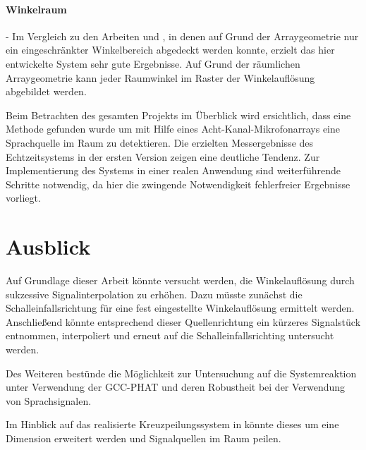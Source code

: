 \paragraph{Winkelraum} - Im Vergleich zu den Arbeiten \cite{Master_Array_Pikora}
 und \cite{Master_Array_Mueller}, in denen auf Grund der Arraygeometrie nur ein eingeschränkter Winkelbereich abgedeckt werden konnte, erzielt das hier entwickelte System sehr gute Ergebnisse. Auf Grund der räumlichen Arraygeometrie kann jeder Raumwinkel im Raster der Winkelauflösung abgebildet werden.
 
 

Beim Betrachten des gesamten Projekts im Überblick wird ersichtlich, dass eine Methode gefunden wurde um mit Hilfe eines Acht-Kanal-Mikrofonarrays eine Sprachquelle im Raum zu detektieren. Die erzielten Messergebnisse des Echtzeitsystems in der ersten Version zeigen eine deutliche Tendenz. Zur Implementierung des Systems in einer realen Anwendung sind weiterführende Schritte notwendig, da hier die zwingende Notwendigkeit fehlerfreier Ergebnisse vorliegt.



\section{Ausblick}
\label{sec:Ausblick}
Auf Grundlage dieser Arbeit könnte versucht werden, die Winkelauflösung durch sukzessive Signalinterpolation zu erhöhen. Dazu müsste zunächst die Schalleinfallsrichtung für eine fest eingestellte Winkelauflösung ermittelt werden. Anschließend könnte entsprechend dieser Quellenrichtung ein kürzeres Signalstück entnommen, interpoliert und erneut auf die Schalleinfallsrichting untersucht werden.

Des Weiteren bestünde die Möglichkeit zur Untersuchung auf die Systemreaktion unter Verwendung der GCC-PHAT und deren Robustheit bei der Verwendung von Sprachsignalen. 

Im Hinblick auf das realisierte Kreuzpeilungssystem in \citet{Master_Array_Mueller} könnte dieses um eine Dimension erweitert werden und Signalquellen im Raum peilen.









